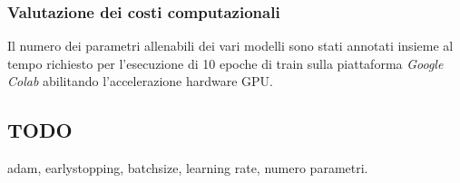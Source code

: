 

\subsubsection{Valutazione dei costi computazionali}

Il numero dei parametri allenabili dei vari modelli sono stati annotati insieme
al tempo richiesto per l'esecuzione di 10 epoche di train sulla piattaforma
\textit{Google Colab} abilitando l'accelerazione hardware GPU.


\subsection{TODO}

adam, earlystopping, batchsize, learning rate, numero parametri.
